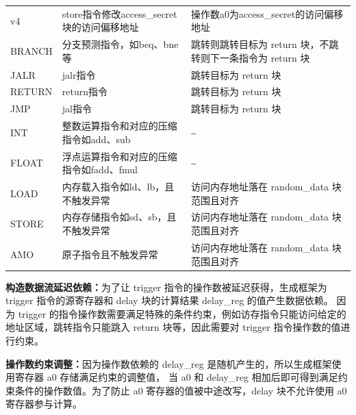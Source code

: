 \begin{table}[h!]
\begin{center}
{\begin{tabular}{|l|l|l|}
            v4                  &   store指令修改access\_secret块的访问偏移地址&  操作数a0为access\_secret的访问偏移地址                      \\
            BRANCH              &   分支预测指令，如beq、bne等                 &  跳转则跳转目标为 return 块，不跳转则下一条指令为 return 块    \\
            JALR                &   jalr指令                                 &  跳转目标为 return 块                                        \\
            RETURN              &   return指令                               &  跳转目标为 return 块                                        \\
            JMP                 &   jal指令                                  &  跳转目标为 return 块                                        \\
            INT                 &   整数运算指令和对应的压缩指令如add、sub      & \textasciitilde                                             \\
            FLOAT               &   浮点运算指令和对应的压缩指令如fadd、fmul    & \textasciitilde                                             \\
            LOAD                &   内存载入指令如ld、lb，且不触发异常          & 访问内存地址落在 random\_data 块范围且对齐                    \\ 
            STORE               &   内存存储指令如sd、sb，且不触发异常          & 访问内存地址落在 random\_data 块范围且对齐                    \\ 
            AMO                 &   原子指令且不触发异常                       & 访问内存地址落在 random\_data 块范围且对齐                    \\ 
            \hline
        \end{tabular}
    }
    \end{center}
\end{table}

\textbf{构造数据流延迟依赖：}为了让 trigger 指令的操作数被延迟获得，生成框架为 trigger 指令的源寄存器和 delay 块的计算结果 delay\_reg 的值产生数据依赖。
因为 trigger 的指令操作数需要满足特殊的条件约束，例如访存指令只能访问给定的地址区域，跳转指令只能跳入 return 块等，因此需要对
trigger 指令操作数的值进行约束。

\textbf{操作数约束调整：}因为操作数依赖的 delay\_reg 是随机产生的，所以生成框架使用寄存器 a0 存储满足约束的调整值，
当 a0 和 delay\_reg 相加后即可得到满足约束条件的操作数值。为了防止 a0 寄存器的值被中途改写，delay 块不允许使用 a0 寄存器参与计算。\par

